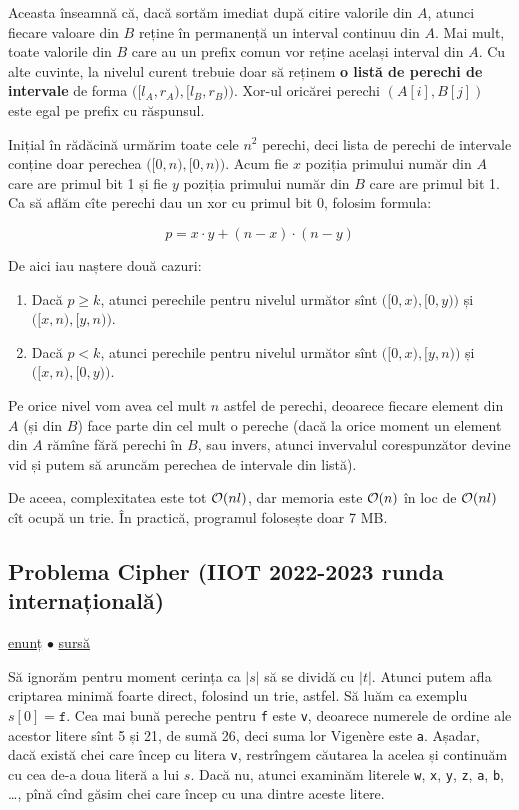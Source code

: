 \documentclass[../main.tex]{subfiles}
\begin{document}
Aceasta înseamnă că, dacă sortăm imediat după citire valorile din $A$, atunci fiecare valoare din $B$ reține în permanență un interval continuu din $A$. Mai mult, toate valorile din $B$ care au un prefix comun vor reține același interval din $A$. Cu alte cuvinte, la nivelul curent trebuie doar să reținem \textbf{o listă de perechi de intervale} de forma $\bigl([l_A, r_A), [l_B, r_B) \bigr)$. Xor-ul oricărei perechi $(A[i], B[j])$ este egal pe prefix cu răspunsul.

Inițial în rădăcină urmărim toate cele $n^2$ perechi, deci lista de perechi de intervale conține doar perechea $\bigl([0, n), [0, n)\bigr)$. Acum fie $x$ poziția primului număr din $A$ care are primul bit 1 și fie $y$ poziția primului număr din $B$ care are primul bit 1. Ca să aflăm cîte perechi dau un xor cu primul bit 0, folosim formula:

$$p = x \cdot y + (n - x) \cdot (n - y)$$

De aici iau naștere două cazuri:

\begin{enumerate}
  \item Dacă $p \geq k$, atunci perechile pentru nivelul următor sînt $\bigl([0, x), [0, y)\bigr)$ și $\bigl([x, n), [y, n)\bigr)$.
  \item Dacă $p < k$, atunci perechile pentru nivelul următor sînt $\bigl([0, x), [y, n)\bigr)$ și $\bigl([x, n), [0, y)\bigr)$.
\end{enumerate}

Pe orice nivel vom avea cel mult $n$ astfel de perechi, deoarece fiecare element din $A$ (și din $B$) face parte din cel mult o pereche (dacă la orice moment un element din $A$ rămîne fără perechi în $B$, sau invers, atunci invervalul corespunzător devine vid și putem să aruncăm perechea de intervale din listă).

De aceea, complexitatea este tot $\mathcal{O}(nl)$, dar memoria este $\mathcal{O}(n)$ în loc de $\mathcal{O}(nl)$ cît ocupă un trie. În practică, programul folosește doar 7 MB.

\subsection{Problema Cipher (IIOT 2022-2023 runda internațională)}
\label{problem:cipher}

\href{https://kilonova.ro/problems/624}{enunț}
$\bullet$
\hyperref[code:cipher]{sursă}

Să ignorăm pentru moment cerința ca $|s|$ să se dividă cu $|t|$. Atunci putem afla criptarea minimă foarte direct, folosind un trie, astfel. Să luăm ca exemplu $s[0] = \texttt{f}$. Cea mai bună pereche pentru \texttt{f} este \texttt{v}, deoarece numerele de ordine ale acestor litere sînt 5 și 21, de sumă 26, deci suma lor Vigenère este \texttt{a}. Așadar, dacă există chei care încep cu litera \texttt{v}, restrîngem căutarea la acelea și continuăm cu cea de-a doua literă a lui $s$. Dacă nu, atunci examinăm literele \texttt{w}, \texttt{x}, \texttt{y}, \texttt{z}, \texttt{a}, \texttt{b}, \dots, pînă cînd găsim chei care încep cu una dintre aceste litere.
\end{document}
